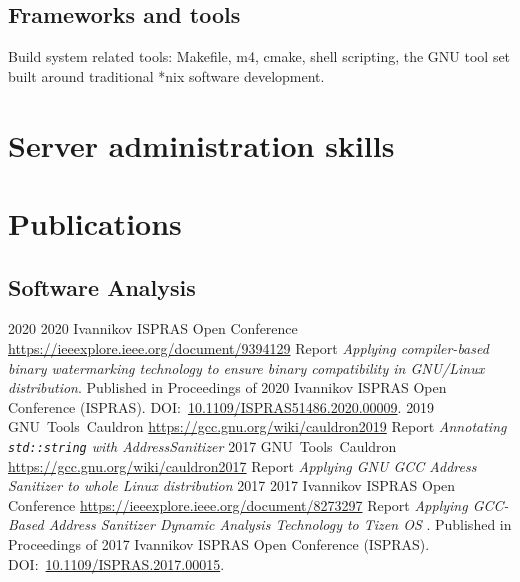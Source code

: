 \documentclass[11pt,a4paper]{moderncv}
\begin{document}
\subsection{Frameworks and tools}
 {Build system related tools: Makefile, m4, cmake, shell scripting, the GNU tool set built around
  traditional *nix software development.}





\section{Server administration skills}

\section{Publications}
\subsection{Software Analysis}
  \cventry
    {2020}
    {2020 Ivannikov ISPRAS Open Conference}
    {\url{https://ieeexplore.ieee.org/document/9394129}}
    {}{}
    {Report \textit{Applying compiler-based binary watermarking technology to
        ensure binary compatibility in GNU/Linux distribution}.\newline{}
      Published in Proceedings of 2020 Ivannikov ISPRAS Open Conference
      (ISPRAS).\newline{}
      DOI:~\href{https://doi.org/10.1109/ISPRAS51486.2020.00009}{10.1109/ISPRAS51486.2020.00009}.
    }
  \cventry
    {2019}
    {GNU~Tools~Cauldron}
    {\url{https://gcc.gnu.org/wiki/cauldron2019}}
    {}{}
    {Report \textit{Annotating \texttt{std::string} with AddressSanitizer}}
  \cventry
    {2017}
    {GNU~Tools~Cauldron}
    {\url{https://gcc.gnu.org/wiki/cauldron2017}}
    {}{}
    {Report \textit{Applying GNU GCC Address Sanitizer to whole Linux distribution}}
  \cventry
    {2017}
    {2017 Ivannikov ISPRAS Open Conference}
    {\url{https://ieeexplore.ieee.org/document/8273297}}
    {}{}
    {Report \textit{Applying GCC-Based Address Sanitizer Dynamic Analysis
        Technology to Tizen OS }.\newline{}
      Published in Proceedings of 2017 Ivannikov ISPRAS Open Conference
      (ISPRAS).\newline{}
      DOI:~\href{https://doi.org/10.1109/ISPRAS.2017.00015}{10.1109/ISPRAS.2017.00015}.
    }
\end{document}
